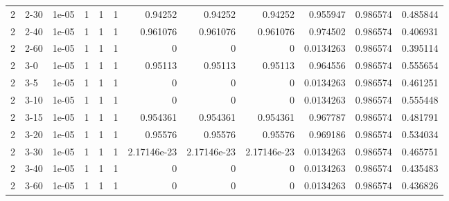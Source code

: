 \begin{tabular}{rlrrrrrrrrrr}
     2 & 2-30   &      1e-05 &           1 &                 1 &                 1 &     0.94252     &     0.94252     &      0.94252     &        0.955947  &               0.986574 &           0.485844 \\
     2 & 2-40   &      1e-05 &           1 &                 1 &                 1 &     0.961076    &     0.961076    &      0.961076    &        0.974502  &               0.986574 &           0.406931 \\
     2 & 2-60   &      1e-05 &           1 &                 1 &                 1 &     0           &     0           &      0           &        0.0134263 &               0.986574 &           0.395114 \\
     2 & 3-0    &      1e-05 &           1 &                 1 &                 1 &     0.95113     &     0.95113     &      0.95113     &        0.964556  &               0.986574 &           0.555654 \\
     2 & 3-5    &      1e-05 &           1 &                 1 &                 1 &     0           &     0           &      0           &        0.0134263 &               0.986574 &           0.461251 \\
     2 & 3-10   &      1e-05 &           1 &                 1 &                 1 &     0           &     0           &      0           &        0.0134263 &               0.986574 &           0.555448 \\
     2 & 3-15   &      1e-05 &           1 &                 1 &                 1 &     0.954361    &     0.954361    &      0.954361    &        0.967787  &               0.986574 &           0.481791 \\
     2 & 3-20   &      1e-05 &           1 &                 1 &                 1 &     0.95576     &     0.95576     &      0.95576     &        0.969186  &               0.986574 &           0.534034 \\
     2 & 3-30   &      1e-05 &           1 &                 1 &                 1 &     2.17146e-23 &     2.17146e-23 &      2.17146e-23 &        0.0134263 &               0.986574 &           0.465751 \\
     2 & 3-40   &      1e-05 &           1 &                 1 &                 1 &     0           &     0           &      0           &        0.0134263 &               0.986574 &           0.435483 \\
     2 & 3-60   &      1e-05 &           1 &                 1 &                 1 &     0           &     0           &      0           &        0.0134263 &               0.986574 &           0.436826 \\

\end{tabular}
